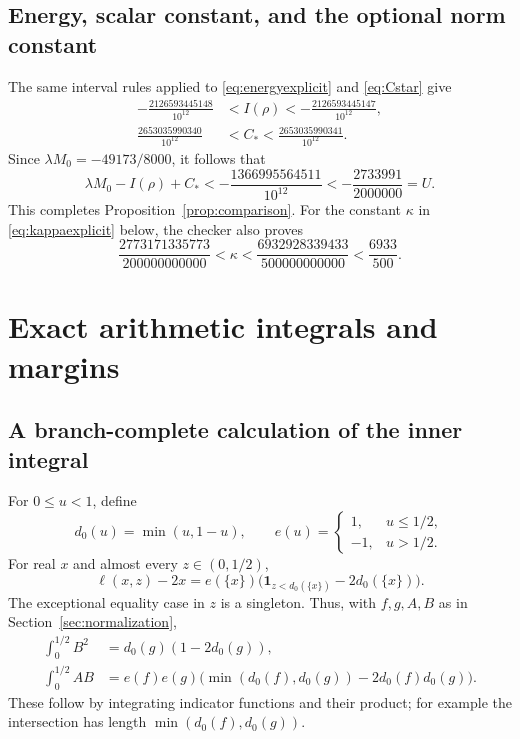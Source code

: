 \subsection{Energy, scalar constant, and the optional norm constant}
The same interval rules applied to \eqref{eq:energyexplicit} and
\eqref{eq:Cstar} give
\begin{align}
 -\frac{2126593445148}{10^{12}}&<I(\rho)
                         <-\frac{2126593445147}{10^{12}},\label{eq:energycert}\\
 \frac{2653035990340}{10^{12}}&<C_*
                         <\frac{2653035990341}{10^{12}}.\label{eq:Cstarcert}
\end{align}
Since $\lambda M_0=-49173/8000$, it follows that
\[
 \lambda M_0-I(\rho)+C_*<
 -\frac{1366995564511}{10^{12}}<-\frac{2733991}{2000000}=U.
\]
This completes Proposition~\ref{prop:comparison}.
For the constant $\kappa$ in \eqref{eq:kappaexplicit} below, the checker
also proves
\begin{equation}\label{eq:kappacert}
 \frac{2773171335773}{200000000000}<\kappa
 <\frac{6932928339433}{500000000000}<\frac{6933}{500}.
\end{equation}

\section{Exact arithmetic integrals and margins}
\label{app:arithmetic}
\subsection{A branch-complete calculation of the inner integral}
For $0\le u<1$, define
\[
 d_0(u)=\min(u,1-u),\qquad
 e(u)=\begin{cases}1,&u\le1/2,\\-1,&u>1/2.\end{cases}
\]
For real $x$ and almost every $z\in(0,1/2)$,
\[
 \ell(x,z)-2x=e(\{x\})
                  \bigl(\boldsymbol1_{z<d_0(\{x\})}-2d_0(\{x\})\bigr).
\]
The exceptional equality case in $z$ is a singleton. Thus, with $f,g,A,B$
as in Section~\ref{sec:normalization},
\begin{align}
 \int_0^{1/2}B^2&=d_0(g)(1-2d_0(g)),\label{eq:BB}\\
 \int_0^{1/2}AB&=e(f)e(g)
  \bigl(\min(d_0(f),d_0(g))-2d_0(f)d_0(g)\bigr).\label{eq:AB}
\end{align}
These follow by integrating indicator functions and their product;
for example the intersection has length $\min(d_0(f),d_0(g))$.

